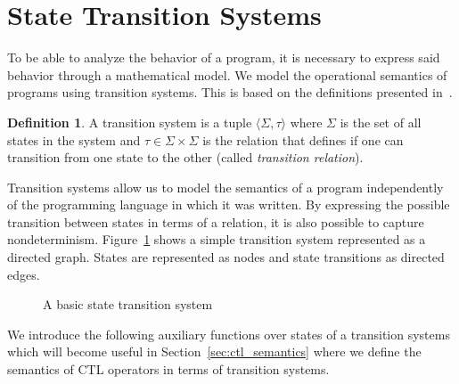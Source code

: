\documentclass[11pt,a4paper,titlepage]{article}
\theoremstyle{definition}
\newtheorem{definition}{Definition}[section]
\begin{document}
\section{State Transition Systems}\label{sec:state_transition_system}

To be able to analyze the behavior of a program, it is necessary 
to express said behavior through a mathematical model. 
We model the operational semantics of programs using transition systems. 
This is based on the definitions presented in~\cite{UrbanM-VMCAI15}.

\begin{definition}
    A transition system is a tuple $\langle \Sigma, \tau \rangle$ where $\Sigma$ 
    is the set of all states in the system and $\tau \in \Sigma \times \Sigma$ 
    is the relation that defines if one can transition from one state to the other (called \emph{transition relation}).
\end{definition}

Transition systems allow us to model the semantics of a program 
independently of the programming language in which it was written. 
By expressing the possible transition between states in terms of a relation, 
it is also possible to capture nondeterminism. Figure~\ref{fig:basic_transition_system} 
shows a simple transition system represented as a directed graph. States are represented as nodes
and state transitions as directed edges.
\\

\begin{figure}
\centering
{}
\caption{A basic state transition system} 
\label{fig:basic_transition_system}
\end{figure}


We introduce the following auxiliary functions over states of a transition systems which will become 
useful in Section~\ref{sec:ctl_semantics} where we define the semantics of CTL operators in terms of transition systems.
\end{document}
